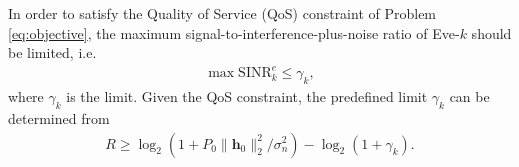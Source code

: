 \documentclass[journal]{IEEEtran}
\begin{document}
In order to satisfy the Quality of Service (QoS) constraint of Problem \eqref{eq:objective}, the maximum signal-to-interference-plus-noise ratio of Eve-$k$ should be limited, i.e.
\begin{eqnarray}
\max \mathrm{SINR}_k^e \leq \gamma_k \label{eq:SINR_constraint},
\end{eqnarray} 
where $\gamma_k$ is the limit. Given the QoS constraint, the predefined limit $\gamma_k$ can be determined from 
\begin{eqnarray}
R \geq \log_2\left(1 + P_0\|\mathbf{h}_0\|_2^2/\sigma_n^2\right) - \log_2\left(1 + \gamma_k\right). \label{eq:modified constraints of QoS}
\end{eqnarray}
\end{document}
